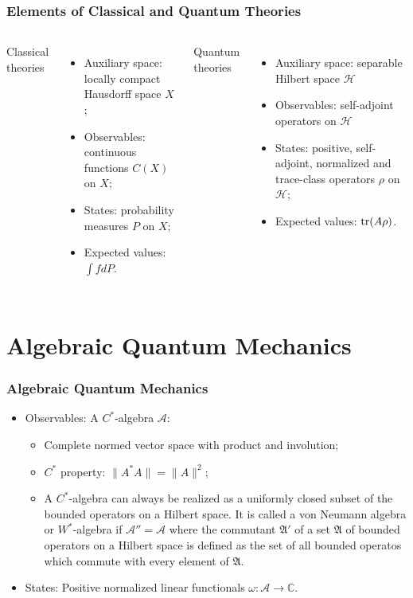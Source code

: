 \documentclass{beamer}
\begin{document}
\begin{frame}
	\frametitle{Elements of Classical and Quantum Theories}
	\begin{columns}
		Classical theories
		\begin{itemize}
			\item<1-> Auxiliary space: locally compact Hausdorff space $X$;
			\item<2-> Observables: continuous functions $C(X)$ on $X$;
			\item<3-> States: probability measures $P$ on $X$;
			\item<4-> Expected values: $\int fdP$.
		\end{itemize}
		Quantum theories
		\begin{itemize}
			\item<1-> Auxiliary space: separable Hilbert space $\mathcal{H}$
			\item<2-> Observables: self-adjoint operators on $\mathcal{H}$
			\item<3-> States: positive, self-adjoint, normalized and trace-class operators $\rho$ on $\mathcal{H}$;
			\item<4-> Expected values: $\tr(A\rho)$.
		\end{itemize}
	\end{columns}
\end{frame}

\section{Algebraic Quantum Mechanics}

\begin{frame}
	\frametitle{Algebraic Quantum Mechanics}
	\begin{itemize}
		\item Observables: A $C^*$-algebra $\mathcal{A}$:
		\begin{itemize}
			\item Complete normed vector space with product and involution;
			\item $C^*$ property: $\|A^*A\|=\|A\|^2$;
			\item A $C^*$-algebra can always be realized as a uniformly closed subset of the bounded operators on a Hilbert space\cite{Bratteli1987}. It is called a von Neumann algebra or $W^*$-algebra if $\mathcal{A}''=\mathcal{A}$ where the commutant $\mathfrak{A}'$ of a set $\mathfrak{A}$ of bounded operators on a Hilbert space is defined as the set of all bounded operatos which commute with every element of $\mathfrak{A}$.
		\end{itemize}
		\vspace{1cm}
		\item States: Positive normalized linear functionals $\omega:\mathcal{A}\rightarrow\mathbb{C}$.
	\end{itemize}
\end{frame}
\end{document}
